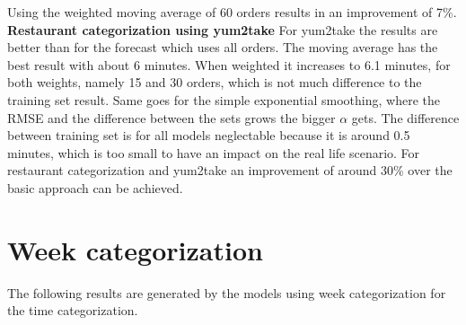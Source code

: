Using the weighted moving average of 60 orders results in an improvement of 7\%.
\newline\newline\textbf{Restaurant categorization using yum2take}\newline
For yum2take the results are better than for the forecast which uses all orders. The moving average has the best result with about 6 minutes. When weighted it increases to 6.1 minutes, for both weights, namely 15 and 30 orders, which is not much difference to the training set result. Same goes for the simple exponential smoothing, where the RMSE and the difference between the sets grows the bigger $\alpha$ gets. The difference between training set is for all models neglectable because it is around 0.5 minutes, which is too small to have an impact on the real life scenario.\newline
For restaurant categorization and yum2take an improvement of around 30\% over the basic approach can be achieved.
\section{Week categorization}\label{section:Week categorization}
The following results are generated by the models using week categorization for the time categorization.

